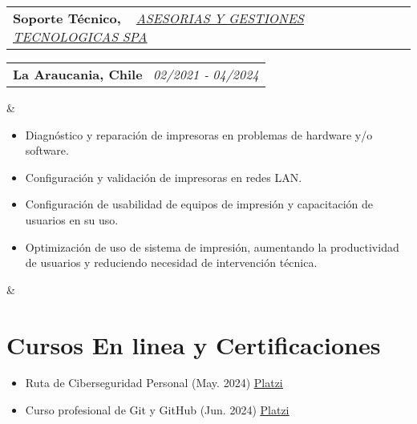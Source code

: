 \documentclass[11pt,a4paper,sans]{moderncv}
\makeatletter
\newcommand{\sectionMargin}{-3mm}
\newcommand*{\customcventry}[7][.13em]{
    \begin{tabular}{@{}l}
    {\bfseries #4} \
    {\itshape #3}
    \end{tabular}
    \hfill
    \begin{tabular}{l@{}}
    {\bfseries #5} \
    {\itshape #2}
    \end{tabular}
    \ifx&#7&%
    \else{\
    \begin{minipage}{\maincolumnwidth}%
    \small#7%
    \end{minipage}}\fi%
    \par\addvspace{#1}
}
\makeatother
\begin{document}
{    \customcventry
        {02/2021 ‐ 04/2024}
        {{ \href{http://www.tisol.cl/}{\underline{ASESORIAS Y GESTIONES TECNOLOGICAS SPA}} }}
        {Soporte Técnico,}
        {La Araucania, Chile}{}
        {{\begin{itemize}[leftmargin=0.6cm, noitemsep, label={\textbullet}]
            \item Diagnóstico y reparación de impresoras en problemas de hardware y/o software.
            \item Configuración y validación de impresoras en redes LAN.
            \item Configuración de usabilidad de equipos de impresión y capacitación de usuarios en su uso.
            \item Optimización de uso de sistema de impresión, aumentando la productividad de usuarios y reduciendo necesidad de intervención técnica.
        \end{itemize}}
    }
}

\vspace*{\sectionMargin}

\section{Cursos En linea y Certificaciones}{
    \begin{itemize}[label=\textbullet, itemsep=0mm]
        \item Ruta de Ciberseguridad Personal (May. 2024) \href{https://1drv.ms/b/c/13c8ae619d64655e/EZYaMe6SBhJAshtvq4ORCQoBwWMYRerI4_xiuqXjORVd0w?e=I4tLqg}{\underline{Platzi}}
        \item Curso profesional de Git y GitHub (Jun. 2024) \href{https://1drv.ms/b/c/13c8ae619d64655e/EXeQGPrTCjFDpmx8pCItVTwB-OS1r-tkKJbmgYnahuxtYg?e=mc9YcH}{\underline{Platzi}}
    \end{itemize}
}

\vspace*{-6mm}
\end{document}
